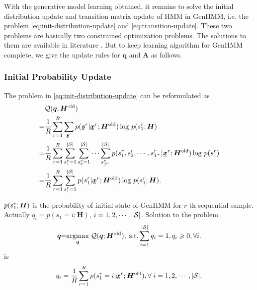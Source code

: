 With the generative model learning obtained, it remains to solve the initial distribution update and transition matrix update of HMM in GenHMM, i.e. the problem \eqref{eq:init-distribution-update} and \eqref{eq:transition-update}. These two problems are basically two constrained optimization problems. The solutions to them are available in literature \cite{Bishop:2006:PRM:1162264}. But to keep learning algorithm for GenHMM complete, we give the update rules for $\bm{q}$ and $\bm{A}$ as follows.

\subsubsection{Initial Probability Update}
The problem in \eqref{eq:init-distribution-update} can be reformulated as
\begin{align}
  &\Qq(\bm{q}; \bm{H}^{\mathrm{old}}) \nonumber \\
  =&\frac{1}{R} \sum_{r=1}^{R}\sum_{\ubmr{s}{r}} {p(\ubmr{s}{r}| \ubmr{x}{r}; \bm{H}^{\mathrm{old}})} \log\,p(\smtr{s}{1}{r};\bm{H}) \nonumber \\
  = & \frac{1}{R}\sum_{r=1}^{R}\sum_{\smtr{s}{1}{r}=1}^{|\Ss|}\sum_{\smtr{s}{2}{r}=1}^{|\Ss|}\cdots \sum_{\smtr{s}{T^{r}}{r}}^{{|\Ss|}} {p(\smtr{s}{1}{r}, \smtr{s}{2}{r}, \cdots, \smtr{s}{T^{r}}{r}| \ubmr{x}{r}; \bm{H}^{\mathrm{old}})} \log\,p(\smtr{s}{1}{r}) \nonumber\\
  =& \frac{1}{R}\sum_{r=1}^{R}\sum_{\smtr{s}{1}{r}=1}^{|\Ss|}{p(\smtr{s}{1}{r}| \ubmr{x}{r}; \bm{H}^{\mathrm{old}})} \log\,p(\smtr{s}{1}{r};\bm{H}).
\end{align}

$p(\smtr{s}{1}{r};\bm{H})$ is the probability of initial state of GenHMM for $r$-th sequential sample. Actually $q_i = p({s}_{1} =i;\bm{H}) $, $i= 1, 2, \cdots, |\Ss|$. Solution to the problem
\begin{align}
  \bm{q} \hspace{-0.1cm} = \hspace{-0.1cm} \uargmax{\bm{q}} \Qq(\bm{q}; \bm{H}^{\mathrm{old}}),\; \mathrm{s.t.} \sum_{i=1}^{ |\Ss| }q_i = 1, q_i \geq 0, \forall i.
\end{align}
is
\begin{equation}\label{eq:update-initial-state-prob}
  q_i = \frac{1}{R} \sum_{r=1}^{R} p(\smtr{s}{1}{r}=i | \ubmr{x}{r}; \bm{H}^{\mathrm{old}}), \forall\; i = 1, 2, \cdots, |\Ss|.
\end{equation}

